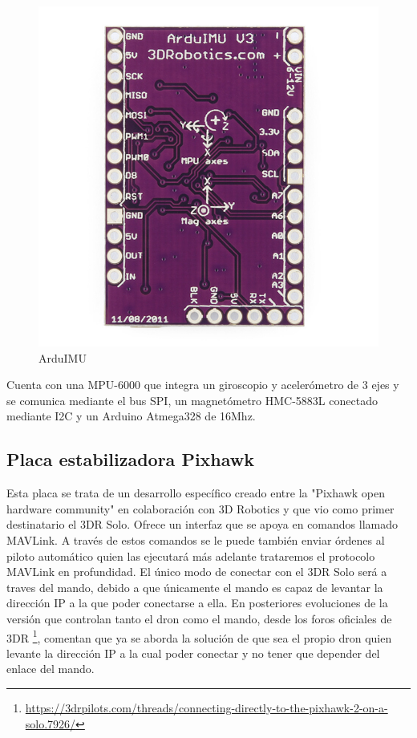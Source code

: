 \begin{figure}[H]
  \centering
  \includegraphics[scale=1]{imagenes/arduimutrasera.jpg}
  \caption{ArduIMU}
  \label{fig:arduimu}
\end{figure}

Cuenta con una MPU-6000 que integra un giroscopio y acelerómetro de 3 ejes y se comunica mediante el bus SPI, un magnetómetro HMC-5883L conectado mediante I2C y un Arduino Atmega328 de 16Mhz.

\subsection{Placa estabilizadora Pixhawk}

Esta placa se trata de un desarrollo específico creado entre la "Pixhawk\cite{pixhawk} open hardware community" en colaboración con 3D Robotics y que vio como primer destinatario el 3DR Solo. Ofrece un interfaz que se apoya en comandos llamado MAVLink. A través de estos comandos se le puede también enviar órdenes al piloto automático quien las ejecutará más adelante trataremos el protocolo MAVLink en profundidad. El único modo de conectar con el 3DR Solo será a traves del mando, debido a que únicamente el mando es capaz de levantar la dirección IP a la que poder conectarse a ella. En posteriores evoluciones de la versión que controlan tanto el dron como el mando, desde los foros oficiales de 3DR \footnote{\url{https://3drpilots.com/threads/connecting-directly-to-the-pixhawk-2-on-a-solo.7926/}}, comentan que ya se aborda la solución de que sea el propio dron quien levante la dirección IP a la cual poder conectar y no tener que depender del enlace del mando.


